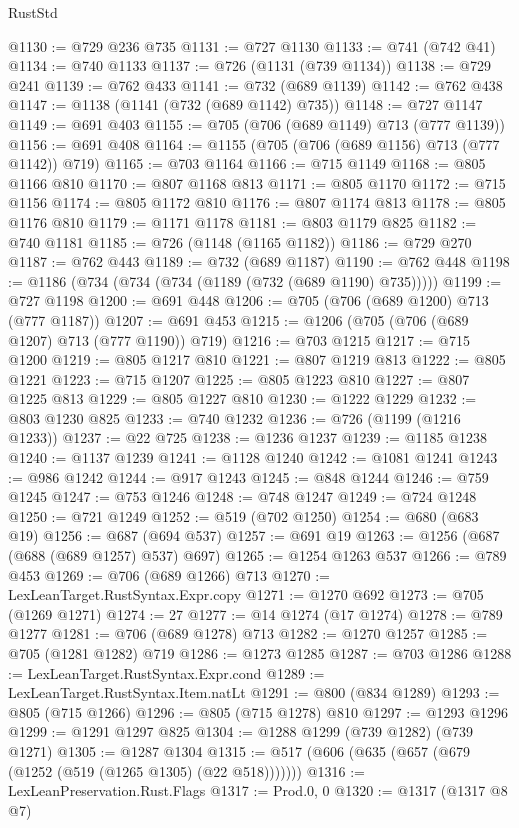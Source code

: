 \begin{lexlean}{RustStd}
\begin{coremodule}
@1130 := @729 @236 @735
@1131 := @727 @1130
@1133 := @741 (@742 @41)
@1134 := @740 @1133
@1137 := @726 (@1131 (@739 @1134))
@1138 := @729 @241
@1139 := @762 @433
@1141 := @732 (@689 @1139)
@1142 := @762 @438
@1147 := @1138 (@1141 (@732 (@689 @1142) @735))
@1148 := @727 @1147
@1149 := @691 @403
@1155 := @705 (@706 (@689 @1149) @713 (@777 @1139))
@1156 := @691 @408
@1164 := @1155 (@705 (@706 (@689 @1156) @713 (@777 @1142)) @719)
@1165 := @703 @1164
@1166 := @715 @1149
@1168 := @805 @1166 @810
@1170 := @807 @1168 @813
@1171 := @805 @1170
@1172 := @715 @1156
@1174 := @805 @1172 @810
@1176 := @807 @1174 @813
@1178 := @805 @1176 @810
@1179 := @1171 @1178
@1181 := @803 @1179 @825
@1182 := @740 @1181
@1185 := @726 (@1148 (@1165 @1182))
@1186 := @729 @270
@1187 := @762 @443
@1189 := @732 (@689 @1187)
@1190 := @762 @448
@1198 := @1186 (@734 (@734 (@734 (@1189 (@732 (@689 @1190) @735)))))
@1199 := @727 @1198
@1200 := @691 @448
@1206 := @705 (@706 (@689 @1200) @713 (@777 @1187))
@1207 := @691 @453
@1215 := @1206 (@705 (@706 (@689 @1207) @713 (@777 @1190)) @719)
@1216 := @703 @1215
@1217 := @715 @1200
@1219 := @805 @1217 @810
@1221 := @807 @1219 @813
@1222 := @805 @1221
@1223 := @715 @1207
@1225 := @805 @1223 @810
@1227 := @807 @1225 @813
@1229 := @805 @1227 @810
@1230 := @1222 @1229
@1232 := @803 @1230 @825
@1233 := @740 @1232
@1236 := @726 (@1199 (@1216 @1233))
@1237 := @22 @725
@1238 := @1236 @1237
@1239 := @1185 @1238
@1240 := @1137 @1239
@1241 := @1128 @1240
@1242 := @1081 @1241
@1243 := @986 @1242
@1244 := @917 @1243
@1245 := @848 @1244
@1246 := @759 @1245
@1247 := @753 @1246
@1248 := @748 @1247
@1249 := @724 @1248
@1250 := @721 @1249
@1252 := @519 (@702 @1250)
@1254 := @680 (@683 @19)
@1256 := @687 (@694 @537)
@1257 := @691 @19
@1263 := @1256 (@687 (@688 (@689 @1257) @537) @697)
@1265 := @1254 @1263 @537
@1266 := @789 @453
@1269 := @706 (@689 @1266) @713
@1270 := LexLeanTarget.RustSyntax.Expr.copy
@1271 := @1270 @692
@1273 := @705 (@1269 @1271)
@1274 := 27
@1277 := @14 @1274 (@17 @1274)
@1278 := @789 @1277
@1281 := @706 (@689 @1278) @713
@1282 := @1270 @1257
@1285 := @705 (@1281 @1282) @719
@1286 := @1273 @1285
@1287 := @703 @1286
@1288 := LexLeanTarget.RustSyntax.Expr.cond
@1289 := LexLeanTarget.RustSyntax.Item.natLt
@1291 := @800 (@834 @1289)
@1293 := @805 (@715 @1266)
@1296 := @805 (@715 @1278) @810
@1297 := @1293 @1296
@1299 := @1291 @1297 @825
@1304 := @1288 @1299 (@739 @1282) (@739 @1271)
@1305 := @1287 @1304
@1315 := @517 (@606 (@635 (@657 (@679 (@1252 (@519 (@1265 @1305) (@22 @518)))))))
@1316 := LexLeanPreservation.Rust.Flags
@1317 := Prod.{0, 0}
@1320 := @1317 (@1317 @8 @7)

\end{coremodule}
\end{lexlean}
